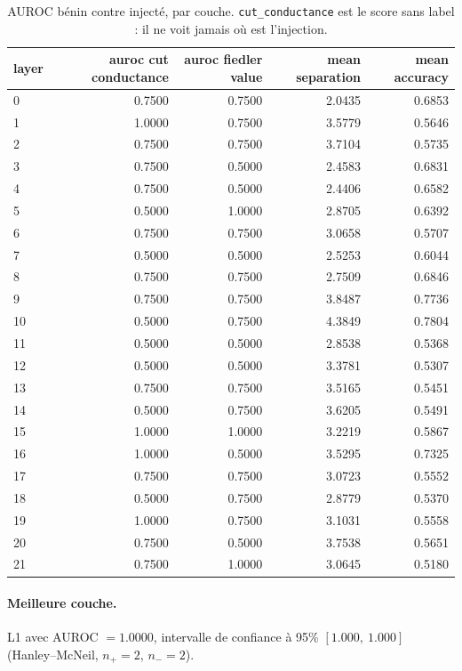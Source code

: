 \documentclass[11pt,a4paper]{article}
\begin{document}
\begin{table}[htbp]
\centering
\small
\begin{tabular}{lrrrr}
\hline
layer & auroc cut conductance & auroc fiedler value & mean separation & mean accuracy \\
\hline
0 & 0.7500 & 0.7500 & 2.0435 & 0.6853 \\
1 & 1.0000 & 0.7500 & 3.5779 & 0.5646 \\
2 & 0.7500 & 0.7500 & 3.7104 & 0.5735 \\
3 & 0.7500 & 0.5000 & 2.4583 & 0.6831 \\
4 & 0.7500 & 0.5000 & 2.4406 & 0.6582 \\
5 & 0.5000 & 1.0000 & 2.8705 & 0.6392 \\
6 & 0.7500 & 0.7500 & 3.0658 & 0.5707 \\
7 & 0.5000 & 0.5000 & 2.5253 & 0.6044 \\
8 & 0.7500 & 0.7500 & 2.7509 & 0.6846 \\
9 & 0.7500 & 0.7500 & 3.8487 & 0.7736 \\
10 & 0.5000 & 0.7500 & 4.3849 & 0.7804 \\
11 & 0.5000 & 0.5000 & 2.8538 & 0.5368 \\
12 & 0.5000 & 0.5000 & 3.3781 & 0.5307 \\
13 & 0.7500 & 0.7500 & 3.5165 & 0.5451 \\
14 & 0.5000 & 0.7500 & 3.6205 & 0.5491 \\
15 & 1.0000 & 1.0000 & 3.2219 & 0.5867 \\
16 & 1.0000 & 0.5000 & 3.5295 & 0.7325 \\
17 & 0.7500 & 0.7500 & 3.0723 & 0.5552 \\
18 & 0.5000 & 0.7500 & 2.8779 & 0.5370 \\
19 & 1.0000 & 0.7500 & 3.1031 & 0.5558 \\
20 & 0.7500 & 0.5000 & 3.7538 & 0.5651 \\
21 & 0.7500 & 1.0000 & 3.0645 & 0.5180 \\
\hline
\end{tabular}
\caption{AUROC bénin contre injecté, par couche. \texttt{cut\_conductance} est le score sans label : il ne voit jamais où est l'injection.}
\label{tab:layers}
\end{table}


\paragraph{Meilleure couche.} L1 avec
AUROC $= 1.0000$, intervalle de confiance à 95\%
$[1.000,\ 1.000]$ (Hanley--McNeil, $n_+ = 2$, $n_- = 2$).
\end{document}
